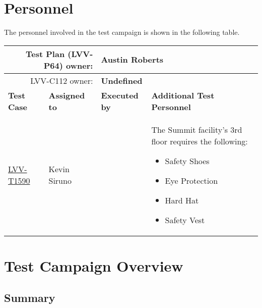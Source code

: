 \documentclass[SE,lsstdraft,STR,toc]{lsstdoc}
\providecommand{\tightlist}{
  \setlength{\itemsep}{0pt}\setlength{\parskip}{0pt}}
\begin{document}
\newpage
\section{Personnel}
\label{sect:personnel}

The personnel involved in the test campaign is shown in the following table.

\begin{longtable}{p{3cm}p{3cm}p{3cm}p{6cm}}
\hline
\multicolumn{2}{r}{Test Plan (LVV-P64) owner:} &
\multicolumn{2}{l}{\textbf{ Austin Roberts } }\\\hline
\multicolumn{2}{r}{ LVV-C112 owner:} &
\multicolumn{2}{l}{\textbf{
    Undefined
}
} \\\hline
\textbf{Test Case} & \textbf{Assigned to} & \textbf{Executed by} & \textbf{Additional Test Personnel} \\ \hline
\href{https://jira.lsstcorp.org/secure/Tests.jspa#/testCase/LVV-T1590}{LVV-T1590}
& {\small Kevin Siruno } & {\small  } &
\begin{minipage}[]{6cm}
\smallskip
{\small The Summit facility's 3rd floor requires the following:

\begin{itemize}
\tightlist
\item
  Safety Shoes
\item
  Eye Protection
\item
  Hard Hat
\item
  Safety Vest
\end{itemize}
 }
\medskip
\end{minipage}
\\ \hline
\end{longtable}

\newpage

\section{Test Campaign Overview}
\label{sect:overview}

\subsection{Summary}
\label{sect:summarytable}
\end{document}
